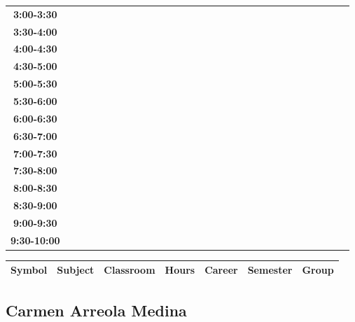\documentclass{article}
\begin{document}
\begin{table}[ht]
\begin{tabular}{|c|c|c|c|c|c|c|c|c|c|c|c|c|c|c|c|c|c|c|c|c|c|c|c|c|c|c|c|c|c|}
\textbf{3:00-3:30} &   &   &   &   &   &   &   \\
 \cline{1-8} 
\textbf{3:30-4:00} &   &   &   &   &   &   &   \\
 \cline{1-8} 
\textbf{4:00-4:30} &   &   &   &   &   &   &   \\
 \cline{1-8} 
\textbf{4:30-5:00} &   &   &   &   &   &   &   \\
 \cline{1-8} 
\textbf{5:00-5:30} &   &   &   &   &   &   &   \\
 \cline{1-8} 
\textbf{5:30-6:00} &   &   &   &   &   &   &   \\
 \cline{1-8} 
\textbf{6:00-6:30} &   &   &   &   &   &   &   \\
 \cline{1-8} 
\textbf{6:30-7:00} &   &   &   &   &   &   &   \\
 \cline{1-8} 
\textbf{7:00-7:30} &   &   &   &   &   &   &   \\
 \cline{1-8} 
\textbf{7:30-8:00} &   &   &   &   &   &   &   \\
 \cline{1-8} 
\textbf{8:00-8:30} &   &   &   &   &   &   &   \\
 \cline{1-8} 
\textbf{8:30-9:00} &   &   &   &   &   &   &   \\
 \cline{1-8} 
\textbf{9:00-9:30} &   &   &   &   &   &   &   \\
 \cline{1-8} 
\textbf{9:30-10:00} &   &   &   &   &   &   &   \\
 \cline{1-8} 
\end{tabular}\end{table}

        
        \begin{tabular}{|>{\centering\arraybackslash}m{2cm}|>{\centering\arraybackslash}m{4cm}|>{\centering\arraybackslash}m{2cm}|>{\centering\arraybackslash}m{2cm}|>{\centering\arraybackslash}m{2cm}|>{\centering\arraybackslash}m{2cm}|>{\centering\arraybackslash}m{2cm}|}
        \hline
        \textbf{Symbol} & \textbf{Subject} & \textbf{Classroom} & \textbf{Hours} & \textbf{Career} & \textbf{Semester} & \textbf{Group} \\
        \hline
        \end{tabular}
                    

        \newpage
        

        \subsection{Carmen Arreola Medina}
        \vspace*{.1cm}
        
\end{document}
